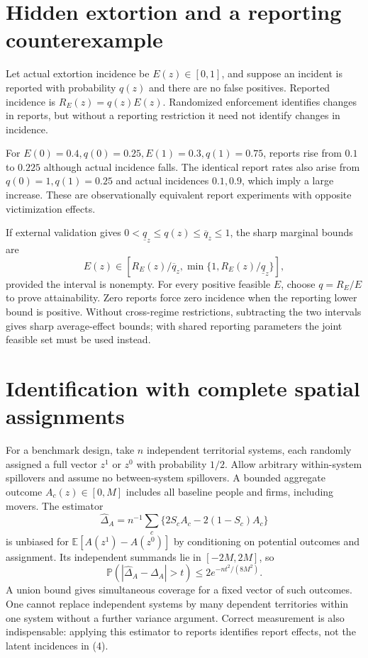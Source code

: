 \documentclass[11pt,a4paper]{article}
\newcommand{\E}{\mathbb E}
\newcommand{\Prb}{\mathbb P}
\begin{document}
\section{Hidden extortion and a reporting counterexample}
Let actual extortion incidence be $E(z)\in[0,1]$, and suppose an incident is reported with probability $q(z)$ and there are no false positives. Reported incidence is $R_E(z)=q(z)E(z)$. Randomized enforcement identifies changes in reports, but without a reporting restriction it need not identify changes in incidence.

For $E(0)=0.4,q(0)=0.25,E(1)=0.3,q(1)=0.75$, reports rise from $0.1$ to $0.225$ although actual incidence falls. The identical report rates also arise from $q(0)=1,q(1)=0.25$ and actual incidences $0.1,0.9$, which imply a large increase. These are observationally equivalent report experiments with opposite victimization effects.

If external validation gives $0<\underline q_z\le q(z)\le\overline q_z\le1$, the sharp marginal bounds are
\[
 E(z)\in\left[R_E(z)/\overline q_z,
              \min\{1,R_E(z)/\underline q_z\}\right], \tag{4}
\]
provided the interval is nonempty. For every positive feasible $E$, choose $q=R_E/E$ to prove attainability. Zero reports force zero incidence when the reporting lower bound is positive. Without cross-regime restrictions, subtracting the two intervals gives sharp average-effect bounds; with shared reporting parameters the joint feasible set must be used instead.

\section{Identification with complete spatial assignments}
For a benchmark design, take $n$ independent territorial systems, each randomly assigned a full vector $z^1$ or $z^0$ with probability $1/2$. Allow arbitrary within-system spillovers and assume no between-system spillovers. A bounded aggregate outcome $A_c(z)\in[0,M]$ includes all baseline people and firms, including movers. The estimator
\[
 \widehat\Delta_A=n^{-1}\sum_c\{2S_cA_c-2(1-S_c)A_c\}
\]
is unbiased for $\E[A(z^1)-A(z^0)]$ by conditioning on potential outcomes and assignment. Its independent summands lie in $[-2M,2M]$, so
\[
 \Prb(|\widehat\Delta_A-\Delta_A|>t)\le2e^{-nt^2/(8M^2)}.
\]
A union bound gives simultaneous coverage for a fixed vector of such outcomes. One cannot replace independent systems by many dependent territories within one system without a further variance argument. Correct measurement is also indispensable: applying this estimator to reports identifies report effects, not the latent incidences in (4).
\end{document}
